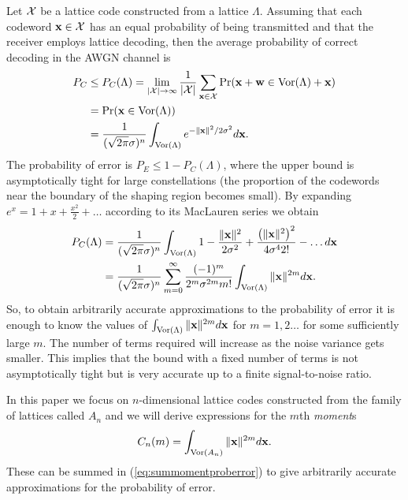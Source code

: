 \documentclass[draftcls, onecolumn, 11pt]{IEEEtran}
\begin{document}
Let $\mathcal X$ be a lattice code constructed from a lattice $\Lambda$.  Assuming that each codeword $\mathbf{x} \in \mathcal X$ has an equal probability of being transmitted and that the receiver employs lattice decoding, then the average probability of correct decoding in the AWGN channel is
\begin{align}
P_C &\leq P_C(\Lambda) = \lim_{\abs{\calX}\rightarrow \infty}
 \frac{1}{\abs{\calX}} \sum_{\xbf\in \calX} \prob( \xbf + \wbf \in
\vor(\Lambda) + \xbf )  \nonumber \\
&= \prob(\xbf \in \vor(\Lambda) ) \nonumber \\
&=   \frac{1}{(\sqrt{2\pi}\sigma)^n} \int_{\vor(\Lambda)}
e^{-\|\xbf\|^2 / 2\sigma^2 } d\xbf. \label{eq:PEgaussian}
\end{align}
The probability of error is $P_E \leq 1 - P_C(\Lambda)$, where the upper bound is asymptotically tight for large constellations (the proportion of the codewords near the boundary of the shaping region becomes small).  By expanding $e^x = 1  + x + \frac{x^2}{2} + \dots$ according to its MacLauren series we obtain
\begin{align}
P_C(\Lambda)  &= \frac{1}{(\sqrt{2\pi}\sigma)^n}\int_{\vor(\Lambda)} 1
- \frac{\|\xbf\|^2}{2\sigma^2} + \frac{\left(\|\xbf\|^2\right)^2}{
4\sigma^42!} - \dots d\xbf \nonumber \\
&= \frac{1}{(\sqrt{2\pi}\sigma)^n} \sum_{m=0}^\infty
\frac{(-1)^m}{2^m\sigma^{2m}m!} \int_{\vor(\Lambda)} \|\xbf\|^{2m}
d\xbf.  \label{eq:summomentproberror}
\end{align}
So, to obtain arbitrarily accurate approximations to the probability of error it is enough to know the values of $\int_{\operatorname{Vor}(\Lambda)} \|\mathbf{x}\|^{2m} d\mathbf{x}$ for $m=1,2\dots$ for some sufficiently large $m$.  The number of terms required will increase as the noise variance gets smaller.  This implies that the bound with a fixed number of terms is not asymptotically tight but is very accurate up to a finite signal-to-noise ratio.


In this paper we focus on $n$-dimensional lattice codes constructed from the family of lattices called $A_n$ and  we will derive expressions for the $m$th \emph{moment}s
\[
 C_n(m) = \int_{\operatorname{Vor}(A_n)} \|\mathbf{x}\|^{2m} d\mathbf{x}.
\]
These can be summed in (\ref{eq:summomentproberror}) to give arbitrarily accurate approximations for the probability of error.
\end{document}
